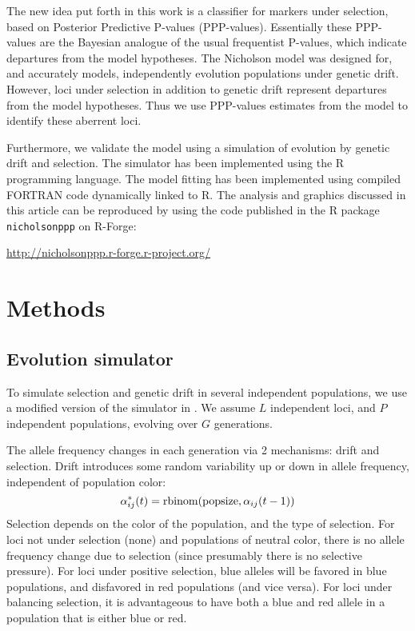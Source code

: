 \documentclass[a4paper,12pt]{article}
\begin{document}
The new idea put forth in this work is a classifier for markers under
selection, based on Posterior Predictive P-values
(PPP-values)\cite{pppvalues}. Essentially these PPP-values are the
Bayesian analogue of the usual frequentist P-values, which indicate
departures from the model hypotheses. The Nicholson model was designed
for, and accurately models, independently evolution populations under
genetic drift. However, loci under selection in addition to genetic
drift represent departures from the model hypotheses. Thus we use
PPP-values estimates from the model to identify these aberrent loci.

Furthermore, we validate the model using a simulation of evolution by
genetic drift and selection. The simulator has been implemented using
the R programming language\cite{R}. The model fitting has been
implemented using compiled FORTRAN code dynamically linked to R. The
analysis and graphics discussed in this article can be reproduced by
using the code published in the R package \texttt{nicholsonppp} on
R-Forge\cite{R-Forge}:

 \url{http://nicholsonppp.r-forge.r-project.org/}

\section{Methods}

\subsection{Evolution simulator}

To simulate selection and genetic drift in several independent
populations, we use a modified version of the simulator in
\cite{Beaumont-Balding}. We assume $L$ independent loci, and $P$
independent populations, evolving over $G$ generations.

The allele frequency changes in each generation via
2 mechanisms: drift and selection. Drift introduces some random
variability up or down in allele frequency, independent of population
color:
$$\alpha_{ij}^*(t) = \operatorname{rbinom}(\text{popsize},\alpha_{ij}(t-1))$$
Selection depends on the color of the population, and the type of
selection. For loci not under selection (none) and populations of
neutral color, there is no allele frequency change due to selection
(since presumably there is no selective pressure). For loci under
positive selection, blue alleles will be favored in blue populations,
and disfavored in red populations (and vice versa). For loci under
balancing selection, it is advantageous to have both a blue and red
allele in a population that is either blue or red.
\end{document}
